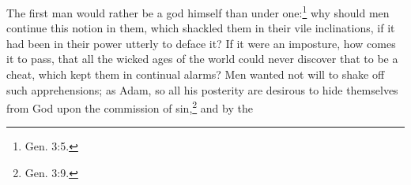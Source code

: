 \documentclass[a5paper]{book}
\begin{document}
The first man would rather be a god himself than under one:\footnote{Gen. 3:5.}
    why should men continue this notion in them, 
    which shackled them in their vile inclinations, 
    if it had been in their power utterly to deface it? 
If it were an imposture, how comes it to pass, 
    that all the wicked ages of the world could never 
    discover that to be a cheat,
    which kept them in continual alarms? 
Men wanted not will to shake off such apprehensions; 
    as Adam, so all his posterity are desirous 
    to hide themselves from God upon the commission of sin,\footnote{Gen. 3:9.}
    and by the
\end{document}
